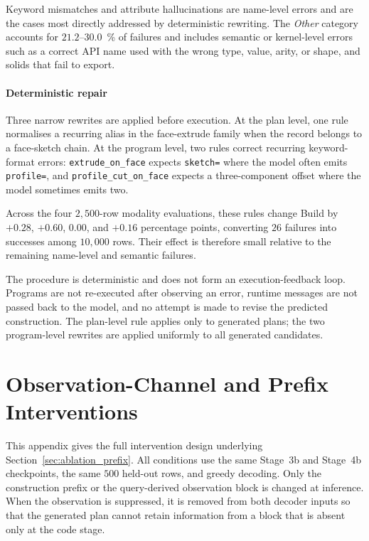 \documentclass[preprint,12pt]{elsarticle}
\begin{document}
Keyword mismatches and attribute hallucinations are name-level errors and are the cases most
directly addressed by deterministic rewriting. The \emph{Other} category accounts for
$21.2$--$30.0$~\% of failures and includes semantic or kernel-level errors such as a correct
API name used with the wrong type, value, arity, or shape, and solids that fail to export.

\paragraph{Deterministic repair}
Three narrow rewrites are applied before execution. At the plan level, one rule normalises a
recurring alias in the face-extrude family when the record belongs to a face-sketch chain. At
the program level, two rules correct recurring keyword-format errors:
\texttt{extrude\_on\_face} expects \texttt{sketch=} where the model often emits
\texttt{profile=}, and \texttt{profile\_cut\_on\_face} expects a three-component offset where
the model sometimes emits two.

Across the four $2{,}500$-row modality evaluations, these rules change Build by $+0.28$,
$+0.60$, $0.00$, and $+0.16$ percentage points, converting $26$ failures into successes
among $10{,}000$ rows. Their effect is therefore small relative to the remaining name-level
and semantic failures.

The procedure is deterministic and does not form an execution-feedback loop. Programs are not
re-executed after observing an error, runtime messages are not passed back to the model, and no
attempt is made to revise the predicted construction. The plan-level rule applies only to
generated plans; the two program-level rewrites are applied uniformly to all generated
candidates.


\section{Observation-Channel and Prefix Interventions}
\label{app:interventions}

This appendix gives the full intervention design underlying
Section~\ref{sec:ablation_prefix}. All conditions use the same Stage~3b and Stage~4b
checkpoints, the same $500$ held-out rows, and greedy decoding. Only the construction prefix
or the query-derived observation block is changed at inference. When the observation is
suppressed, it is removed from both decoder inputs so that the generated plan cannot retain
information from a block that is absent only at the code stage.
\end{document}
